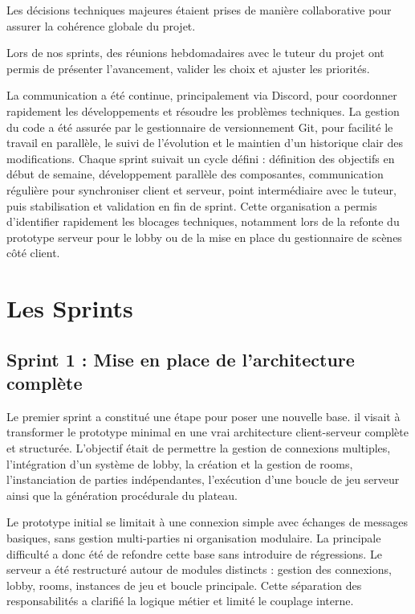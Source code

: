 \documentclass[a4paper, 11pt]{article}
\begin{document}
Les décisions techniques majeures étaient prises de manière collaborative pour assurer la cohérence globale du projet.

Lors de nos sprints, des réunions hebdomadaires avec le tuteur du projet ont permis de présenter l’avancement, valider les choix et ajuster les priorités.

La communication a été continue, principalement via Discord, pour coordonner rapidement les développements et résoudre les problèmes techniques. La gestion du code a été assurée par le gestionnaire de versionnement Git, pour facilité le travail en parallèle, le suivi de l’évolution et le maintien d’un historique clair des modifications. Chaque sprint suivait un cycle défini : définition des objectifs en début de semaine, développement parallèle des composantes, communication régulière pour synchroniser client et serveur, point intermédiaire avec le tuteur, puis stabilisation et validation en fin de sprint. Cette organisation a permis d’identifier rapidement les blocages techniques, notamment lors de la refonte du prototype serveur pour le lobby ou de la mise en place du gestionnaire de scènes côté client.

\section{Les Sprints}

\subsection{Sprint 1 : Mise en place de l’architecture complète}

Le premier sprint a constitué une étape pour poser une nouvelle base. il visait à transformer le prototype minimal en une vrai architecture client-serveur complète et structurée. L’objectif était de permettre la gestion de connexions multiples, l’intégration d’un système de lobby, la création et la gestion de rooms, l’instanciation de parties indépendantes, l’exécution d’une boucle de jeu serveur ainsi que la génération procédurale du plateau.

Le prototype initial se limitait à une connexion simple avec échanges de messages basiques, sans gestion multi-parties ni organisation modulaire. La principale difficulté a donc été de refondre cette base sans introduire de régressions. Le serveur a été restructuré autour de modules distincts : gestion des connexions, lobby, rooms, instances de jeu et boucle principale. Cette séparation des responsabilités a clarifié la logique métier et limité le couplage interne.
\end{document}
